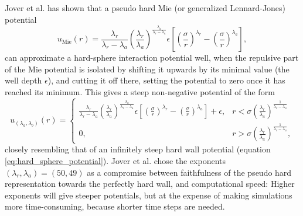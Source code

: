 Jover et al. \cite{ref:jover:pseudo_hard} has shown that a pseudo hard Mie (or generalized Lennard-Jones) potential
\begin{equation}
    u_{\text{Mie}}(r) = 
        \frac{\lambda_r}{\lambda_r - \lambda_a}
        \left(\frac{\lambda_r}{\lambda_a}\right)
        ^{\frac{\lambda_a}{\lambda_r - \lambda_a}}
        \epsilon \left[
            \left(\frac{\sigma}{r}\right)^{\lambda_r} -
            \left(\frac{\sigma}{r}\right)^{\lambda_a}
        \right],
\end{equation}
can approximate a hard-sphere interaction potential well, when the repulsive part of the Mie potential is isolated by shifting it upwards by its minimal value 
(the well depth $\epsilon$), %
and cutting it off there, setting the potential to zero once it has reached its minimum.
This gives a steep non-negative potential of the form
\begin{equation}
    u_{(\lambda_a, \lambda_b)}(r) = 
    \begin{cases}
        \frac{\lambda_r}{\lambda_r - \lambda_a}
        \left(\frac{\lambda_r}{\lambda_a}\right)
        ^{\frac{\lambda_a}{\lambda_r - \lambda_a}}
        \epsilon \left[
            \left(\frac{\sigma}{r}\right)^{\lambda_r} -
            \left(\frac{\sigma}{r}\right)^{\lambda_a}
        \right]
        + \epsilon,
            & r < \sigma \left(
                \frac{\lambda_r}{\lambda_a}
            \right)^\frac{1}{\lambda_r - \lambda_a} \\
        0,  & r > \sigma \left(
                \frac{\lambda_r}{\lambda_a}
            \right)^\frac{1}{\lambda_r - \lambda_a},
    \end{cases}
\end{equation}
closely resembling that of an infinitely steep hard wall potential (equation \ref{eq:hard_sphere_potential}).
Jover et al. chose the exponents $(\lambda_r, \lambda_a) = (50, 49)$ as a compromise between 
faithfulness of the pseudo hard representation towards the perfectly hard wall, and computational speed:
Higher exponents will give steeper potentials, but at the expense of making simulations more time-consuming, 
because shorter time steps are needed.

